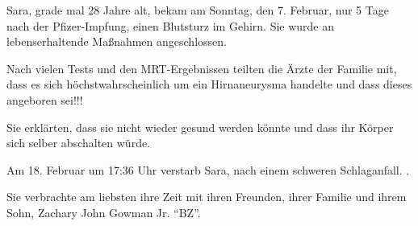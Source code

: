 Sara, grade mal 28 Jahre alt, bekam am Sonntag, den 7. Februar, nur 5 Tage nach
der Pfizer-Impfung, einen Blutsturz im Gehirn. Sie wurde an lebenserhaltende
Maßnahmen angeschlossen.

Nach vielen Tests und den MRT-Ergebnissen teilten die Ärzte der Familie mit,
dass es sich höchstwahrscheinlich um ein Hirnaneurysma handelte und dass dieses
angeboren sei!!!

Sie erklärten, dass sie nicht wieder gesund werden könnte und dass ihr Körper
sich selber abschalten würde.

Am 18. Februar um 17:36 Uhr verstarb Sara, nach einem schweren Schlaganfall. .

Sie verbrachte am liebsten ihre Zeit mit ihren Freunden, ihrer Familie und ihrem
Sohn, Zachary John Gowman Jr. ``BZ''.
